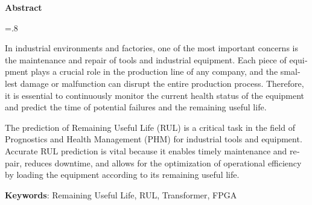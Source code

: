 


\pagestyle{empty}

\begin{latin}

\begin{center}
\textbf{Abstract}
\end{center}
\baselineskip=.8\baselineskip

In industrial environments and factories, one of the most important concerns is the maintenance and repair of tools and industrial equipment. Each piece of equipment plays a crucial role in the production line of any company, and the smallest damage or malfunction can disrupt the entire production process. Therefore, it is essential to continuously monitor the current health status of the equipment and predict the time of potential failures and the remaining useful life.


The prediction of Remaining Useful Life (RUL) is a critical task in the field of Prognostics and Health Management (PHM) for industrial tools and equipment. Accurate RUL prediction is vital because it enables timely maintenance and repair, reduces downtime, and allows for the optimization of operational efficiency by loading the equipment according to its remaining useful life.


\bigskip\noindent\textbf{Keywords}:
Remaining Useful Life, RUL, Transformer, FPGA

\end{latin}

